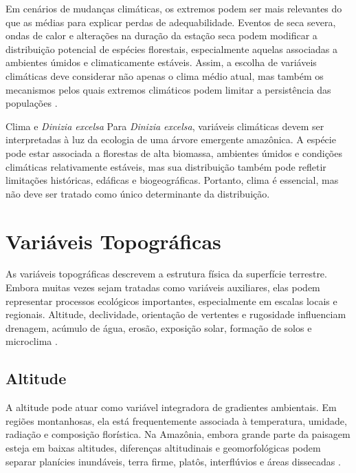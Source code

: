 Em cenários de mudanças climáticas, os extremos podem ser mais relevantes do que as médias para explicar perdas de adequabilidade. Eventos de seca severa, ondas de calor e alterações na duração da estação seca podem modificar a distribuição potencial de espécies florestais, especialmente aquelas associadas a ambientes úmidos e climaticamente estáveis. Assim, a escolha de variáveis climáticas deve considerar não apenas o clima médio atual, mas também os mecanismos pelos quais extremos climáticos podem limitar a persistência das populações \parencite{thuiller2004effects,araujo2005validation}.

\begin{caixaaplicacao}{Clima e \textit{Dinizia excelsa}}
	Para \textit{Dinizia excelsa}, variáveis climáticas devem ser interpretadas à luz da ecologia de uma árvore emergente amazônica. A espécie pode estar associada a florestas de alta biomassa, ambientes úmidos e condições climáticas relativamente estáveis, mas sua distribuição também pode refletir limitações históricas, edáficas e biogeográficas. Portanto, clima é essencial, mas não deve ser tratado como único determinante da distribuição.
\end{caixaaplicacao}

\section{Variáveis Topográficas}

As variáveis topográficas descrevem a estrutura física da superfície terrestre. Embora muitas vezes sejam tratadas como variáveis auxiliares, elas podem representar processos ecológicos importantes, especialmente em escalas locais e regionais. Altitude, declividade, orientação de vertentes e rugosidade influenciam drenagem, acúmulo de água, erosão, exposição solar, formação de solos e microclima \parencite{franklin2010mapping,guisan2017habitat}.

\subsection{Altitude}

A altitude pode atuar como variável integradora de gradientes ambientais. Em regiões montanhosas, ela está frequentemente associada à temperatura, umidade, radiação e composição florística. Na Amazônia, embora grande parte da paisagem esteja em baixas altitudes, diferenças altitudinais e geomorfológicas podem separar planícies inundáveis, terra firme, platôs, interflúvios e áreas dissecadas \parencite{terborgh1973distribution,tuomisto2019diversity}.

